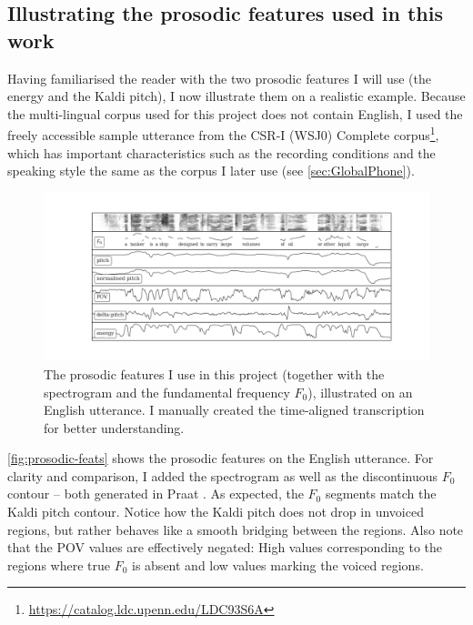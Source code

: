 \documentclass[bsc,frontabs,twoside,singlespacing,parskip,deptreport]{infthesis}
\begin{document}
{{    \subsection{Illustrating the prosodic features used in this work}{
      Having familiarised the reader with the two prosodic features I will use (the energy and the Kaldi pitch), I now illustrate them on a realistic example. Because the multi-lingual corpus used for this project does not contain English, I used the freely accessible sample utterance from the CSR-I (WSJ0) Complete corpus\footnote{\url{https://catalog.ldc.upenn.edu/LDC93S6A}}, which has important characteristics such as the recording conditions and the speaking style the same as the corpus I later use (see \autoref{sec:GlobalPhone}).
      \begin{figure}[h!t]
        \centering
        \vspace{-1.2em}
        \hspace*{-2.4cm}
        \includegraphics[width=18.7cm]{../img/prosody_sample.png} %
        \vspace*{-3em}
        \caption{The prosodic features I use in this project (together with the spectrogram and the fundamental frequency $F_0$), illustrated on an English utterance. I manually created the time-aligned transcription for better understanding.}
        \label{fig:prosodic-feats}
      \end{figure}
      
      \autoref{fig:prosodic-feats} shows the prosodic features on the English utterance. For clarity and comparison, I added the spectrogram as well as the discontinuous $F_0$ contour -- both generated in Praat \citep{Praat}. As expected, the $F_0$ segments match the Kaldi pitch contour. Notice how the Kaldi pitch does not drop in unvoiced regions, but rather behaves like a smooth bridging between the regions. Also note that the POV values are effectively negated: High values corresponding to the regions where true $F_0$ is absent and low values marking the voiced regions.
    }
  }
}
\end{document}
